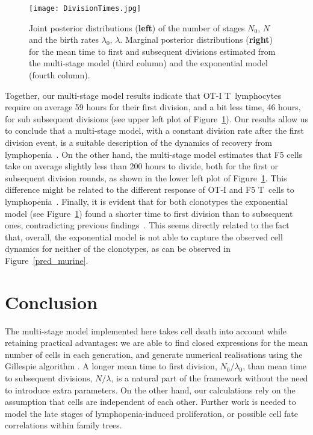 \documentclass[10pt]{article}
\numberwithin{equation}{section}
\begin{document}
\begin{figure}[htp!]
    \centering
    \texttt{[image: DivisionTimes.jpg]}
    \caption{Joint posterior distributions ({\bf left}) of the number of stages $N_0$, $N$ and the birth rates $\lambda_0$, $\lambda$. Marginal posterior distributions ({\bf right}) for the mean time to first and subsequent divisions estimated from the multi-stage model (third column) and the exponential model (fourth column).}
    \label{div_time_mice}
\end{figure}
Together, our multi-stage model results indicate that 
OT-I T~lymphocytes
require on average 59 hours for their first division, and a bit less
time, 46 hours, for sub
 subsequent divisions (see upper left plot of Figure~\ref{div_time_mice}). 
 Our results allow us to conclude that a multi-stage model, 
 with a constant division rate after the first division event, is
 a suitable description of  the dynamics
 of recovery from lymphopenia~\cite{gett2000cellular}. On the other hand, the multi-stage model estimates that F5 cells take on average slightly less than 200 hours to divide, both for the first or subsequent division rounds, as shown in the lower left plot of Figure~\ref{div_time_mice}. This difference might be related to the different response of OT-I and F5 T~cells to lymphopenia~\cite{hogan}. 
 Finally, it is evident that for both clonotypes the exponential model 
 (see Figure~\ref{div_time_mice}) found a shorter time to first division than to subsequent ones, contradicting previous findings~\cite{hawkins2007model,kinjyo2015real,markham2010minimum}. This seems directly related to the fact that, overall, the exponential model is not able to capture the observed cell dynamics for neither of the clonotypes, as can be observed in Figure~\ref{pred_murine}.

\section{Conclusion}  
\label{discussion}

The multi-stage model implemented here takes cell death into account
while retaining practical advantages: we are able to find closed
expressions for the mean number of cells in each generation, and
generate numerical realisations using the Gillespie algorithm \cite{gillespie1,gillespie2}. A
longer mean time to first division, $N_0/\lambda_0$, than mean
time to subsequent divisions, $N/\lambda$, is a natural part of the
framework without the need to introduce extra parameters. On the other
hand, our calculations rely on the assumption that cells are
independent of each other. Further work is needed to model the late
stages of lymphopenia-induced proliferation, or possible
cell fate correlations within family trees. \\
\end{document}
